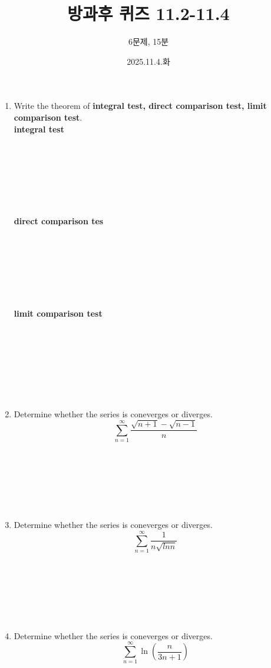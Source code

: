 \documentclass[12pt, a4paper]{article}
\title{방과후 퀴즈 11.2-11.4}
\author{6문제, 15분}
\date{2025.11.4.화}
\begin{document}
\maketitle 
\begin{enumerate}
    \item Write the theorem of \textbf{integral test, direct comparison test, limit comparison test}.\\ 
    \textbf{integral test} \\ \\ \\ \\ \\ \\ \\ \\
    \textbf{direct comparison tes} \\ \\ \\ \\ \\ \\ \\ \\
    \textbf{limit comparison test}\\ \\ \\ \\ \\ \\ \\ \\
          
    \item Determine whether the series is coneverges or diverges. 
    \[ \sum_{n=1}^{\infty} \dfrac{\sqrt{n+1}-\sqrt{n-1}}{n}\]  \\ \\ \\ \\ \\ \\
    
    \item Determine whether the series is coneverges or diverges. 
    \[ \sum_{n=1}^{\infty} \dfrac{1}{n\sqrt{lnn}} \] \\ \\ \\ \\ \\ \\

    \item Determine whether the series is coneverges or diverges. 
    \[ \sum_{n=1}^{\infty} \ln({\dfrac{n}{3n+1}})\] \\ \\ \\ \\ \\ \\ 
    

\end{enumerate}
\end{document}
